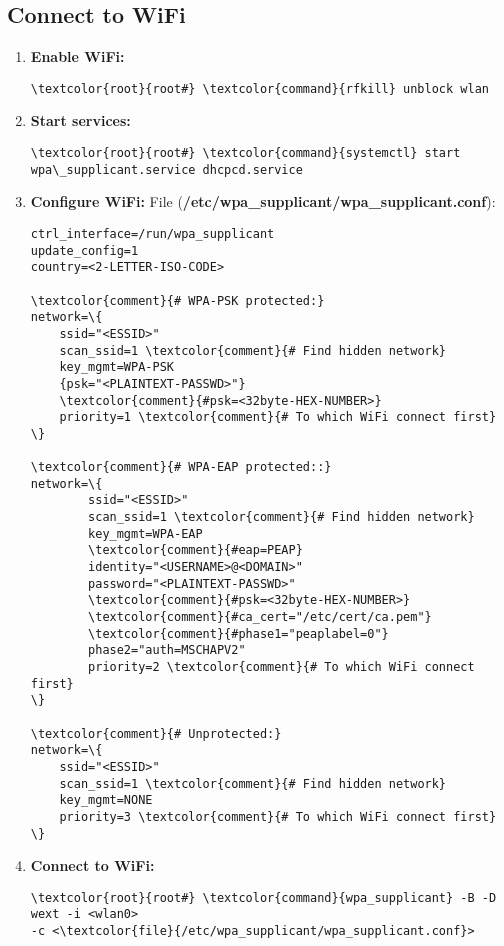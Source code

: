 \documentclass[10pt, a4paper, onecolumn, openany]{book} %
\begin{document}
\subsection{Connect to WiFi}
\begin{enumerate}
    \item \textbf{Enable WiFi:}
\begin{Verbatim}[commandchars=\\\{\}]
\textcolor{root}{root#} \textcolor{command}{rfkill} unblock wlan
\end{Verbatim}
    \item \textbf{Start services:}
\begin{Verbatim}[commandchars=\\\{\}]
\textcolor{root}{root#} \textcolor{command}{systemctl} start wpa\_supplicant.service dhcpcd.service
\end{Verbatim}
    \item \textbf{Configure WiFi:}
\newline File (\textbf{\textcolor{file}{/etc/wpa\_supplicant/wpa\_supplicant.conf}}):
\begin{Verbatim}[commandchars=\\\{\}]
ctrl_interface=/run/wpa_supplicant
update_config=1
country=<2-LETTER-ISO-CODE>

\textcolor{comment}{# WPA-PSK protected:}
network=\{
    ssid="<ESSID>"
    scan_ssid=1 \textcolor{comment}{# Find hidden network}
    key_mgmt=WPA-PSK
    {psk="<PLAINTEXT-PASSWD>"}
    \textcolor{comment}{#psk=<32byte-HEX-NUMBER>}
    priority=1 \textcolor{comment}{# To which WiFi connect first}
\}

\textcolor{comment}{# WPA-EAP protected::}
network=\{
        ssid="<ESSID>"
        scan_ssid=1 \textcolor{comment}{# Find hidden network}
        key_mgmt=WPA-EAP
        \textcolor{comment}{#eap=PEAP}
        identity="<USERNAME>@<DOMAIN>"
        password="<PLAINTEXT-PASSWD>"
        \textcolor{comment}{#psk=<32byte-HEX-NUMBER>}
        \textcolor{comment}{#ca_cert="/etc/cert/ca.pem"}
        \textcolor{comment}{#phase1="peaplabel=0"}
        phase2="auth=MSCHAPV2"
        priority=2 \textcolor{comment}{# To which WiFi connect first}
\}

\textcolor{comment}{# Unprotected:}
network=\{
    ssid="<ESSID>"
    scan_ssid=1 \textcolor{comment}{# Find hidden network}
    key_mgmt=NONE
    priority=3 \textcolor{comment}{# To which WiFi connect first}
\}    
\end{Verbatim}

    \item \textbf{Connect to WiFi:}
\begin{Verbatim}[commandchars=\\\{\}]
\textcolor{root}{root#} \textcolor{command}{wpa_supplicant} -B -D wext -i <wlan0> 
-c <\textcolor{file}{/etc/wpa_supplicant/wpa_supplicant.conf}>
\end{Verbatim}
\end{enumerate}
\end{document}
